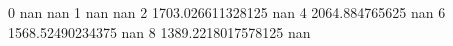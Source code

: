 0 nan nan
1 nan nan
2 1703.026611328125 nan
4 2064.884765625 nan
6 1568.52490234375 nan
8 1389.2218017578125 nan
